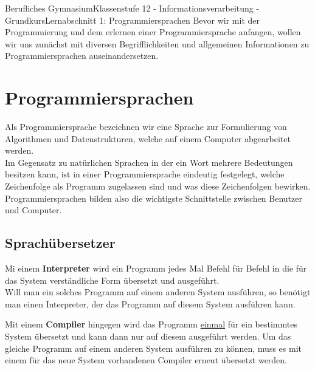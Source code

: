 \documentclass[11pt,oneside,openany,headings=optiontotoc,11pt,numbers=noenddot]{article}
\begin{document}
	\begin{worksheet}{Berufliches Gymnasium}{Klassenstufe 12 - Informationsverarbeitung - Grundkurs}{Lernabschnitt 1: Programmiersprachen}
		\setlength{\columnseprule}{0pt}
		\noindent
		Bevor wir mit der Programmierung und dem erlernen einer Programmiersprache anfangen, wollen wir uns zunächst mit diversen Begrifflichkeiten und allgemeinen Informationen zu Programmiersprachen auseinandersetzen.
		\section{Programmiersprachen}
		Als Programmiersprache bezeichnen wir eine Sprache zur Formulierung von Algorithmen und Datenstrukturen, welche auf einem Computer abgearbeitet werden.\\
		Im Gegensatz zu natürlichen Sprachen in der ein Wort mehrere Bedeutungen besitzen kann, ist in einer Programmiersprache eindeutig festgelegt, welche Zeichenfolge als Programm zugelassen sind und was diese Zeichenfolgen bewirken.\\
		Programmiersprachen bilden also die wichtigste Schnittstelle zwischen Benutzer und Computer.
		\subsection{Sprachübersetzer}
		Mi einem \textbf{Interpreter} wird ein Programm jedes Mal Befehl für Befehl in die für das System verständliche Form übersetzt und ausgeführt.\\
		Will man ein solches Programm auf einem anderen System ausführen, so benötigt man einen Interpreter, der das Programm auf diesem System ausführen kann.\\
		\par\noindent
		Mit einem \textbf{Compiler} hingegen wird das Programm \underline{einmal} für ein bestimmtes System übersetzt und kann dann nur auf diesem ausgeführt werden. Um das gleiche Programm auf einem anderen System ausführen zu können, muss es mit einem für das neue System vorhandenen Compiler erneut übersetzt werden.

\end{worksheet}
\end{document}
